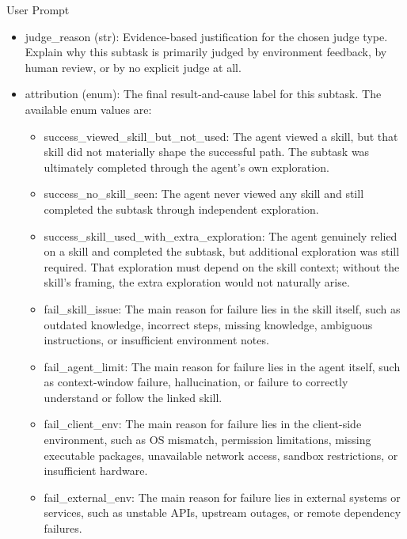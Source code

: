 \documentclass{llmxive}
\providecommand{\svinlinecode}[1]{{\ttfamily #1}}
\begin{document}
\begin{svpromptbox}{User Prompt}
\begin{itemize}
\begin{itemize}
\item \svinlinecode{human}: The subtask result fundamentally depends on human preference-based review or evaluation.
\item \svinlinecode{unknown}: There is no explicit judge signal.
\end{itemize}
\item \svinlinecode{judge\_reason} (\svinlinecode{str}): Evidence-based justification for the chosen judge type. Explain why this subtask is primarily judged by environment feedback, by human review, or by no explicit judge at all.
\item \svinlinecode{attribution} (\svinlinecode{enum}): The final result-and-cause label for this subtask. The available enum values are:
\begin{itemize}
\item \svinlinecode{success\_viewed\_skill\_but\_not\_used}: The agent viewed a skill, but that skill did not materially shape the successful path. The subtask was ultimately completed through the agent's own exploration.
\item \svinlinecode{success\_no\_skill\_seen}: The agent never viewed any skill and still completed the subtask through independent exploration.
\item \svinlinecode{success\_skill\_used\_with\_extra\_exploration}: The agent genuinely relied on a skill and completed the subtask, but additional exploration was still required. That exploration must depend on the skill context; without the skill's framing, the extra exploration would not naturally arise.
\item \svinlinecode{fail\_skill\_issue}: The main reason for failure lies in the skill itself, such as outdated knowledge, incorrect steps, missing knowledge, ambiguous instructions, or insufficient environment notes.
\item \svinlinecode{fail\_agent\_limit}: The main reason for failure lies in the agent itself, such as context-window failure, hallucination, or failure to correctly understand or follow the linked skill.
\item \svinlinecode{fail\_client\_env}: The main reason for failure lies in the client-side environment, such as OS mismatch, permission limitations, missing executable packages, unavailable network access, sandbox restrictions, or insufficient hardware.
\item \svinlinecode{fail\_external\_env}: The main reason for failure lies in external systems or services, such as unstable APIs, upstream outages, or remote dependency failures.

\end{itemize}
\end{itemize}
\end{svpromptbox}
\end{document}
